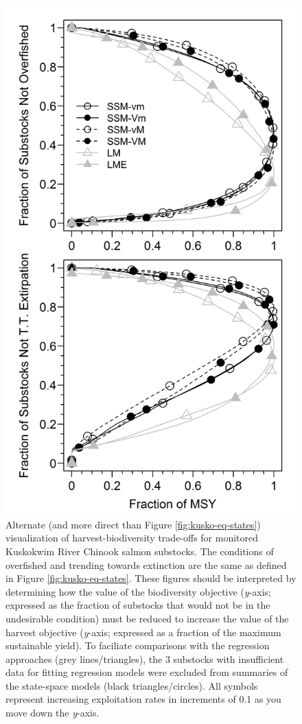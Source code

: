 \documentclass[12pt,]{book}
\theoremstyle{definition}
\theoremstyle{definition}
\theoremstyle{definition}
\theoremstyle{remark}
\begin{document}
\begin{figure}
  \centering
  \includegraphics{img/Ch4/kusko-trade-offs.jpg}
  \caption{Alternate (and more direct than Figure \ref{fig:kusko-eq-states}) visualization of harvest-biodiversity trade-offs for monitored Kuskokwim River Chinook salmon substocks. The conditions of overfished and trending towards extinction are the same as defined in Figure \ref{fig:kusko-eq-states}. These figures should be interpreted by determining how the value of the biodiversity objective (\textit{y}-axis; expressed as the fraction of substocks that would not be in the undesirable condition) must be reduced to increase the value of the harvest objective (\textit{y}-axis; expressed as a fraction of the maximum sustainable yield). To faciliate comparisons with the regression approaches (grey lines/triangles), the 3 substocks with insufficient data for fitting regression models were excluded from summaries of the state-space models (black triangles/circles). All symbols represent increasing exploitation rates in increments of 0.1 as you move down the \textit{y}-axis.}
  \label{fig:kusko-trade-offs}
\end{figure}
\end{document}
